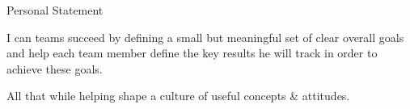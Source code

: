 \begin{rubric}{Personal Statement}{

  \prefix{}

  \entry*

  I can teams succeed by defining a small but meaningful set of clear overall
  goals and help each team member define the key results he will track in order to
  achieve these goals.

  All that while helping shape a culture of useful concepts \& attitudes.

}
\end{rubric}
